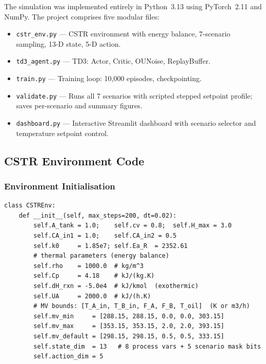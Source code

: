 \documentclass[12pt,a4paper]{article}
\begin{document}
The simulation was implemented entirely in Python~3.13 using PyTorch~2.11 and
NumPy. The project comprises five modular files:

\begin{itemize}
  \item \texttt{cstr\_env.py} --- CSTR environment with energy balance,
        7-scenario sampling, 13-D state, 5-D action.
  \item \texttt{td3\_agent.py} --- TD3: Actor, Critic, OUNoise, ReplayBuffer.
  \item \texttt{train.py} --- Training loop: 10{,}000 episodes, checkpointing.
  \item \texttt{validate.py} --- Runs all 7 scenarios with scripted stepped
        setpoint profile; saves per-scenario and summary figures.
  \item \texttt{dashboard.py} --- Interactive Streamlit dashboard with scenario
        selector and temperature setpoint control.
\end{itemize}

\subsection{CSTR Environment Code}

\subsubsection{Environment Initialisation}

\begin{lstlisting}[style=python,
  caption={CSTREnv initialisation: geometry, feed properties, thermal parameters, MV bounds.}]
class CSTREnv:
    def __init__(self, max_steps=200, dt=0.02):
        self.A_tank = 1.0;    self.cv = 0.8;  self.H_max = 3.0
        self.CA_in1 = 1.0;    self.CA_in2 = 0.5
        self.k0     = 1.85e7; self.Ea_R  = 2352.61
        # thermal parameters (energy balance)
        self.rho    = 1000.0  # kg/m^3
        self.Cp     = 4.18    # kJ/(kg.K)
        self.dH_rxn = -5.0e4  # kJ/kmol  (exothermic)
        self.UA     = 2000.0  # kJ/(h.K)
        # MV bounds: [T_A_in, T_B_in, F_A, F_B, T_oil]  (K or m3/h)
        self.mv_min     = [288.15, 288.15, 0.0, 0.0, 303.15]
        self.mv_max     = [353.15, 353.15, 2.0, 2.0, 393.15]
        self.mv_default = [298.15, 298.15, 0.5, 0.5, 333.15]
        self.state_dim  = 13   # 8 process vars + 5 scenario mask bits
        self.action_dim = 5
\end{lstlisting}
\end{document}

